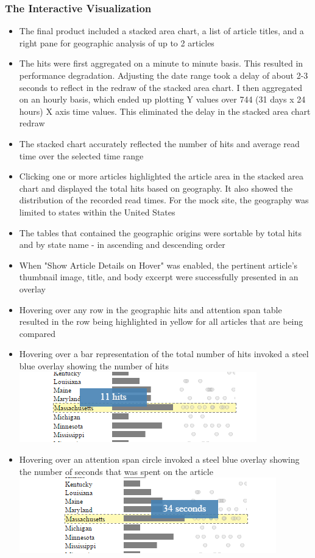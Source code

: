 \documentclass[12pt]{article}
\begin{document}
\subsubsection{The Interactive Visualization}
\begin{itemize}
\item The final product included a stacked area chart, a list of article titles, and a right pane for geographic analysis of up to 2 articles
\item The hits were first aggregated on a minute to minute basis. This resulted in performance degradation. Adjusting the date range took a delay of about 2-3 seconds to reflect in the redraw of the stacked area chart. I then aggregated on an hourly basis, which ended up plotting Y values over 744 (31 days x 24 hours) X axis time values. This eliminated the delay in the stacked area chart redraw
\item The stacked chart accurately reflected the number of hits and average read time over the selected time range
\item Clicking one or more articles highlighted the article area in the stacked area chart and displayed the total hits based on geography. It also showed the distribution of the recorded read times. For the mock site, the geography was limited to states within the United States
\item The tables that contained the geographic origins were sortable by total hits and by state name - in ascending and descending order
\item When "Show Article Details on Hover" was enabled, the pertinent article's thumbnail image, title, and body excerpt were successfully presented in an overlay
\item Hovering over any row in the geographic hits and attention span table resulted in the row being highlighted in yellow for all articles that are being compared
\item Hovering over a bar representation of the total number of hits invoked a steel blue overlay showing the number of hits
\\
\noindent\includegraphics[scale=0.8]{img/state_hit_hover} \\  

\item Hovering over an attention span circle invoked a steel blue overlay showing the number of seconds that was spent on the article
\noindent\includegraphics[scale=0.8]{img/state_circle_hover} \\  
\end{itemize} 
\end{document}
